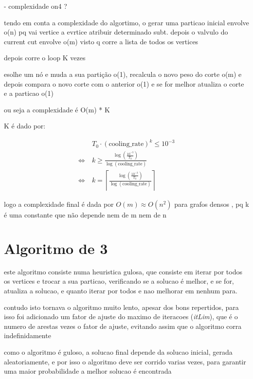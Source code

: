 \documentclass[mirror, portugues]{revdetua}
\begin{document}
- complexidade on4 ?

tendo em conta a complexidade do algortimo, o gerar uma particao inicial envolve o(n) pq vai vertice a evrtice atribuir determinado subt. depois o valvulo do current cut envolve o(m) visto q corre a lista de todos os vertices

depois corre o loop K vezes

esolhe um nó e muda a sua partição o(1), recalcula o novo peso do corte o(m) e depois compara o novo corte com o anterior o(1) e se for melhor atualiza o corte e a particao o(1)

ou seja a complexidade é O(m) * K

K é dado por:

\begin{align*}
    &T_0 \cdot (\text{cooling\_rate})^k \le 10^{-3} \\
    \Leftrightarrow\ &  k \geq  \frac{\log\left(\frac{10^{-3}}{T_0}\right)}{\log(\text{cooling\_rate})} \\
    \Leftrightarrow\ & k = \left\lceil \frac{\log\left(\frac{10^{-3}}{T_0}\right)}{\log(\text{cooling\_rate})} \right\rceil
\end{align*}

logo a complexidade final é dada por $O(m) \approx O(n^2)$ para grafos densos , pq k é uma constante que não depende nem de m nem de n 




\section{Algoritmo de 3}

este algoritmo consiste numa heuristica gulosa, que consiste em iterar por todos os vertices e trocar a sua particao, verificando se a solucao é melhor, e se for, atualiza a solucao, e quanto iterar por todos e nao melhorar em nenhum para.

contudo isto tornava o algoritmo muito lento, apesar dos bons repertidos, para isso foi adicionado um fator de ajuste do maximo de iteracoes (\textit{itLim}), que é o numero de arestas vezes o fator de ajuste, evitando assim que o algoritmo corra indefinidamente

como o algoritmo é guloso, a solucao final depende da solucao inicial, gerada aleatoriamente, e por isso o algoritmo deve ser corrido varias vezes, para garantir uma maior probabilidade a melhor solucao é encontrada
\end{document}
